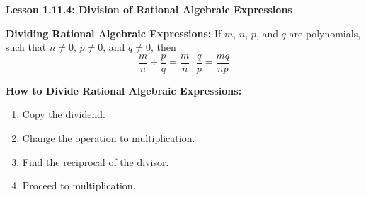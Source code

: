 \begin{center}
\textbf{Lesson 1.11.4: Division of Rational Algebraic Expressions}
\end{center}

\vspace*{1ex}

\textbf{Dividing Rational Algebraic Expressions:} If $ m $, $ n $, $ p $, and $ q $ are polynomials, such that $ n \neq 0 $, $ p \neq 0 $, and $ q \neq 0 $, then \[ \dfrac{m}{n} \div \dfrac{p}{q} = \dfrac{m}{n} \cdot \dfrac{q}{p} = \dfrac{mq}{np} \]

\textbf{How to Divide Rational Algebraic Expressions:}
\begin{enumerate} 
	\item Copy the dividend.   
	\item Change the operation to multiplication.  
	\item Find the reciprocal of the divisor. 
	\item Proceed to multiplication. 
\end{enumerate}

